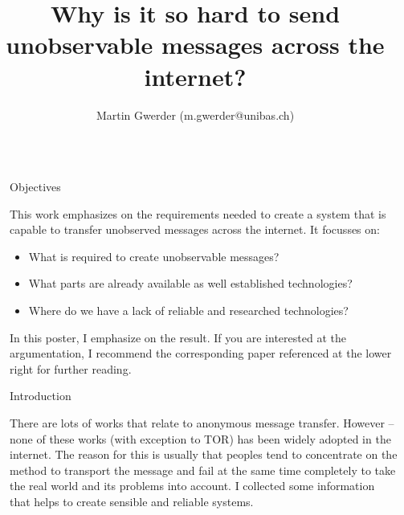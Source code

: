 \documentclass[10pt]{beamer}
\title{\LARGE Why is it so hard to send unobservable messages across the internet?} %
\author{Martin Gwerder (m.gwerder@unibas.ch)} %
\institute{Department of Mathematics and Computer Science, University of Basel} %
\newlength{\sepwid}
\newlength{\onecolwid}
\begin{document}
%
\begin{frame}[t] %

\begin{columns}[t] %

\begin{column}{\sepwid}\end{column} %

\begin{column}{\onecolwid} %


\begin{alertblock}{Objectives}

This work emphasizes on the requirements needed to create a system that is capable to transfer unobserved messages across the internet. It focusses on:
\begin{itemize}
\item What is required to create unobservable messages?
\item What parts are already available as well established technologies?
\item Where do we have a lack of reliable and researched technologies?
\end{itemize}

In this poster, I emphasize on the result. If you are interested at the argumentation, I recommend the corresponding paper referenced at the lower right for further reading.

\end{alertblock}

\vfill
\begin{block}{Introduction}

There are lots of works\cite{tor-design}\cite{mixmaster-spec}\cite{xor-trees}\cite{Levine:2002} that relate to anonymous message transfer. However -- none of these works (with exception to TOR\cite{tor-design}) has been widely adopted in the internet. The reason for this is usually that peoples tend to concentrate on the method to transport the message and fail at the same time completely to take the real world and its problems into account. I collected some information that helps to create sensible and reliable systems. 


\end{block}
\end{column}
\end{columns}
\end{frame}
\end{document}
